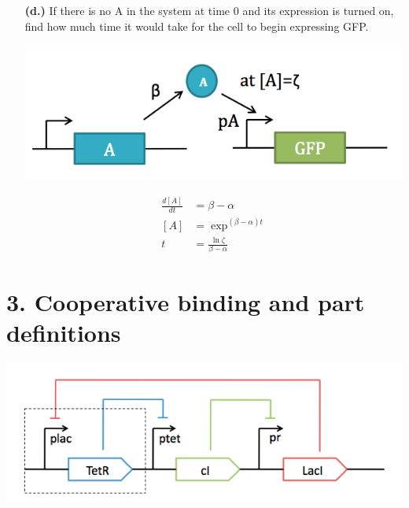 \documentclass[11pt]{article}
\begin{document}
\begin{itemize}
\item[{\bf (d.)}] If there is no A in the system at time 0 and its expression is turned on, find how much time it would take for the cell to begin expressing GFP.


{
  \centering
  \includegraphics[scale=0.5, trim = 0mm 0mm 7mm 0mm, clip]{ps_2_timebio.png}\par
 }
 
\begin{equation*}
  \begin{align}
  \frac{d[A]}{dt}&=\beta - \alpha\\
  [A] &= \exp^{(\beta-\alpha)t}\\
  t &= \frac{\ln{\zeta}}{\beta-\alpha}
  \end{align}
\end{equation*}

\end{itemize}

\newpage

\section*{3. Cooperative binding and part definitions}

{
  \centering
  \includegraphics[scale=0.5, trim = 0mm 0mm 7mm 0mm, clip]{ps_2_repress.png}\par
 }
\end{document}
